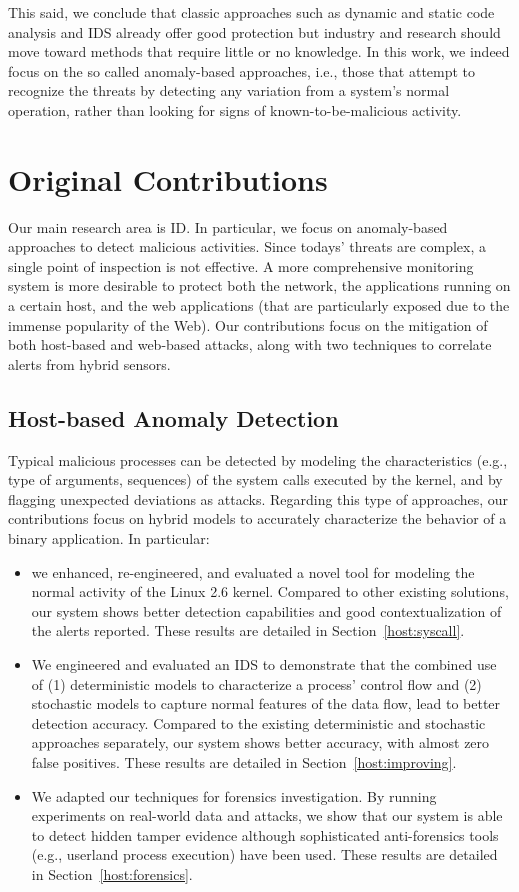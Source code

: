 This said, we conclude that classic approaches such as dynamic and
static code analysis and \ac{IDS} already offer good protection but
industry and research should move toward methods that require little
or no knowledge. In this work, we indeed focus on the so called
anomaly-based approaches, i.e., those that attempt to recognize the
threats by detecting any variation from a system's normal operation,
rather than looking for signs of known\hyp{}to\hyp{}be\hyp{}malicious
activity.

\section{Original Contributions}
\label{introduction:contributions} Our main research area is
\ac{ID}. In particular, we focus on anomaly-based approaches to detect
malicious activities. Since todays' threats are complex, a single
point of inspection is not effective. A more comprehensive monitoring
system is more desirable to protect both the network, the applications
running on a certain host, and the web applications (that are
particularly exposed due to the immense popularity of the Web). Our
contributions focus on the mitigation of both host-based and web-based
attacks, along with two techniques to correlate alerts from hybrid
sensors.

\subsection{Host-based Anomaly Detection} Typical malicious processes
can be detected by modeling the characteristics (e.g., type of
arguments, sequences) of the system calls executed by the kernel, and
by flagging unexpected deviations as attacks. Regarding this type of
approaches, our contributions focus on hybrid models to accurately
characterize the behavior of a binary application. In particular:

\begin{itemize}
\item we enhanced, re-engineered, and evaluated a novel tool for
  modeling the normal activity of the Linux 2.6 kernel. Compared to
  other existing solutions, our system shows better detection
  capabilities and good contextualization of the alerts
  reported. These results are detailed in Section~\ref{host:syscall}.
\item We engineered and evaluated an \ac{IDS} to demonstrate that the
  combined use of (1) deterministic models to characterize a process'
  control flow and (2) stochastic models to capture normal features of
  the data flow, lead to better detection accuracy. Compared to the
  existing deterministic and stochastic approaches separately, our
  system shows better accuracy, with almost zero false
  positives. These results are detailed in
  Section~\ref{host:improving}.
\item We adapted our techniques for forensics investigation. By
  running experiments on real-world data and attacks, we show that our
  system is able to detect hidden tamper evidence although
  sophisticated anti-forensics tools (e.g., userland process
  execution) have been used. These results are detailed in
  Section~\ref{host:forensics}.
\end{itemize}

